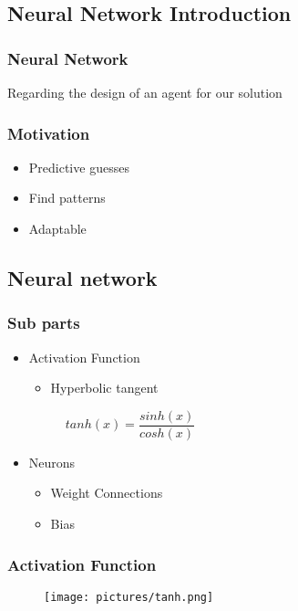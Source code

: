 \subsection{Neural Network Introduction}
\begin{frame}
  \begin{center}
    \frametitle{Neural Network}
			Regarding the design of an agent for our solution
  \end{center}
\end{frame}

\begin{frame}
	\begin{center}
		\frametitle{Motivation}
			\begin{itemize}
				\item Predictive guesses
				\item Find patterns
				\item Adaptable
			\end{itemize}
	\end{center}
\end{frame}

\subsection{Neural network}

\begin{frame}
	\frametitle{Sub parts}
	\begin{itemize}
		\item Activation Function
		\begin{itemize}
			\item Hyperbolic tangent
		\end{itemize}
		\begin{figure}[H]
			\centering
			$tanh(x) = \dfrac{sinh(x)}{cosh(x)}$
		\end{figure}
		\item Neurons
		\begin{itemize}
			\item Weight Connections
			\item Bias
		\end{itemize}
	\end{itemize}
\end{frame}

\begin{frame}
	\frametitle{Activation Function}
	\begin{figure}[H]
		\centering
		\texttt{[image: pictures/tanh.png]}
	\end{figure}
\end{frame}

